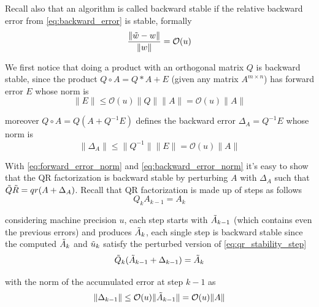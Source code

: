 \noindent Recall also that an algorithm is called backward stable if the relative backward error from \eqref{eq:backward_error} is stable, formally
\begin{equation}
    \frac{\lVert \Tilde{w}-w \rVert}{\lVert w \rVert}=\mathcal{O}(u)
    \label{eq:backward_error_stability}
\end{equation}

\noindent We first notice that doing a product with an orthogonal matrix $Q$ is backward stable, since the product $Q\circ A = Q*A+E$ (given any matrix $A^{m\times n}$) has forward error $E$ whose norm is
\begin{equation}
    \lVert E \rVert \leq \mathcal{O}(u)\lVert Q \rVert \lVert A \rVert = \mathcal{O}(u) \lVert A \rVert
    \label{eq:forward_error_norm}
\end{equation}

\noindent moreover $Q\circ A=Q(A+Q^{-1}E)$ defines the backward error $\Delta_A=Q^{-1}E$ whose norm is
\begin{equation}
    \lVert \Delta_A \rVert \leq \lVert Q^{-1} \rVert \lVert E \rVert = \mathcal{O}(u) \lVert A \rVert
    \label{eq:backward_error_norm}
\end{equation}

\noindent With \eqref{eq:forward_error_norm} and \eqref{eq:backward_error_norm} it's easy to show that the QR factorization is backward stable by perturbing $A$ with $\Delta_A$ such that $\Tilde{Q}\Tilde{R}=qr(A+\Delta_A)$. Recall that QR factorization is made up of steps as follows
\begin{equation}
    Q_k A_{k-1} = A_k
    \label{eq:qr_stability_step}
\end{equation}

\noindent considering machine precision $u$, each step starts with $\Tilde{A}_{k-1}$ (which contains even the previous errors) and produces $\Tilde{A}_k$, each single step is backward stable since the computed $\Tilde{A}_k$ and $\Tilde{u}_k$ satisfy the perturbed version of \eqref{eq:qr_stability_step}
\begin{equation}
    \Tilde{Q}_k (\Tilde{A}_{k-1}+\Delta_{k-1}) = \Tilde{A}_k
    \label{eq:qr_stability_step_perturbed}
\end{equation}

\noindent with the norm of the accumulated error at step $k-1$ as
\begin{equation}
    \lVert \Delta_{k-1} \rVert \leq \mathcal{O}(u)\lVert \Tilde{A}_{k-1} \rVert = \mathcal{O}(u) \lVert A \rVert
    \label{eq:qr_stability_error}
\end{equation}

